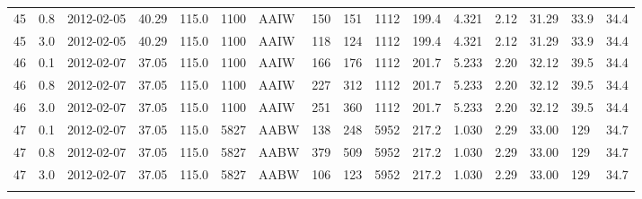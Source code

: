 {\begin{landscape}
\begin{longtable}{llllllllllllllll}
45 & 0.8 & 2012-02-05 & \textminus{}40.29 & 115.0 & 1100 & AAIW & 150 & 151 & 1112 & 199.4 & 4.321 & 2.12 & 31.29 & 33.9 & 34.4\\
45 & 3.0 & 2012-02-05 & \textminus{}40.29 & 115.0 & 1100 & AAIW & 118 & 124 & 1112 & 199.4 & 4.321 & 2.12 & 31.29 & 33.9 & 34.4\\
46 & 0.1 & 2012-02-07 & \textminus{}37.05 & 115.0 & 1100 & AAIW & 166 & 176 & 1112 & 201.7 & 5.233 & 2.20 & 32.12 & 39.5 & 34.4\\
46 & 0.8 & 2012-02-07 & \textminus{}37.05 & 115.0 & 1100 & AAIW & 227 & 312 & 1112 & 201.7 & 5.233 & 2.20 & 32.12 & 39.5 & 34.4\\
46 & 3.0 & 2012-02-07 & \textminus{}37.05 & 115.0 & 1100 & AAIW & 251 & 360 & 1112 & 201.7 & 5.233 & 2.20 & 32.12 & 39.5 & 34.4\\
47 & 0.1 & 2012-02-07 & \textminus{}37.05 & 115.0 & 5827 & AABW & 138 & 248 & 5952 & 217.2 & 1.030 & 2.29 & 33.00 & 129 & 34.7\\
47 & 0.8 & 2012-02-07 & \textminus{}37.05 & 115.0 & 5827 & AABW & 379 & 509 & 5952 & 217.2 & 1.030 & 2.29 & 33.00 & 129 & 34.7\\
47 & 3.0 & 2012-02-07 & \textminus{}37.05 & 115.0 & 5827 & AABW & 106 & 123 & 5952 & 217.2 & 1.030 & 2.29 & 33.00 & 129 & 34.7\\
\bottomrule
\label{tab:advectionfullsampledata}
\end{longtable}
\end{landscape}
}
